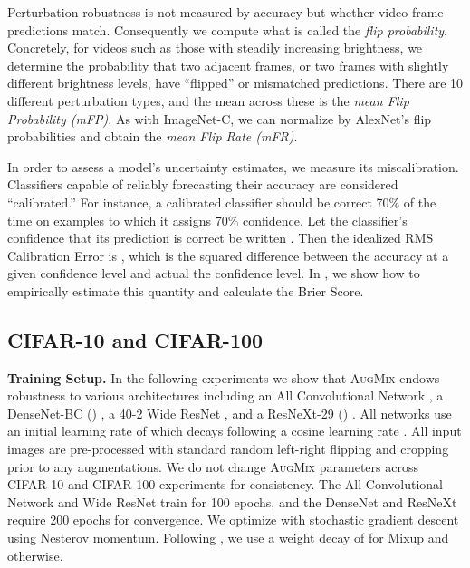 \documentclass{article} \usepackage{iclr2020_conference,times}
\begin{document}
Perturbation robustness is not measured by accuracy but whether video frame predictions match. Consequently we compute what is called the \emph{flip probability}. Concretely, for videos such as those with steadily increasing brightness, we determine the probability that two adjacent frames, or two frames with slightly different brightness levels, have ``flipped'' or mismatched predictions. There are 10 different perturbation types, and the mean across these is the \emph{mean Flip Probability (mFP)}. As with ImageNet-C, we can normalize by AlexNet's flip probabilities and obtain the \emph{mean Flip Rate (mFR)}.

In order to assess a model's uncertainty estimates, we measure its miscalibration. Classifiers capable of reliably forecasting their accuracy are considered ``calibrated.'' For instance, a calibrated classifier should be correct 70\% of the time on examples to which it assigns 70\% confidence. Let the classifier's confidence that its prediction  is correct be written . Then the idealized RMS Calibration Error is
,
which is the squared difference between the accuracy at a given confidence level and actual the confidence level. In , we show how to empirically estimate this quantity and calculate the Brier Score.


\subsection{CIFAR-10 and CIFAR-100}\label{sec:cifar}

\noindent\textbf{Training Setup.} In the following experiments we show that \textsc{AugMix} endows robustness to various architectures including an All Convolutional Network \citep{allconv,weightnorm}, a DenseNet-BC () \citep{densenet} , a 40-2 Wide ResNet \citep{wideresnet}, and a ResNeXt-29 () \citep{resnext}. All networks use an initial learning rate of  which decays following a cosine learning rate \citep{sgdr}. All input images are pre-processed with standard random left-right flipping and cropping prior to any augmentations. We do not change \textsc{AugMix} parameters across CIFAR-10 and CIFAR-100 experiments for consistency. The All Convolutional Network and Wide ResNet train for 100 epochs, and the DenseNet and ResNeXt require 200 epochs for convergence. We optimize with stochastic gradient descent using Nesterov momentum. Following \cite{Zhang2017mixupBE,GuoMixup}, we use a weight decay of  for Mixup and  otherwise.
\end{document}
